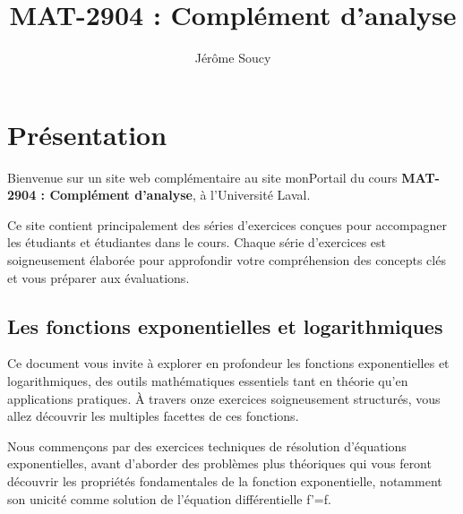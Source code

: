 \documentclass[
  12pt,
  letterpaper,
]{book}
\title{MAT-2904 : Complément d'analyse}
\author{Jérôme Soucy}
\date{}
\renewcommand*\contentsname{Table des matières}
\newcommand\contentsname{Table des matières}
\theoremstyle{remark}
\begin{document}
\frontmatter
\maketitle
\ifdefined\Shaded\renewenvironment{Shaded}{\begin{tcolorbox}[boxrule=0pt, breakable, interior hidden, borderline west={3pt}{0pt}{shadecolor}, frame hidden, sharp corners, enhanced]}{\end{tcolorbox}}\fi

\renewcommand*\contentsname{Table des matières}
{
\hypersetup{linkcolor=}
\setcounter{tocdepth}{2}
\tableofcontents
}
\listoffigures
\listoftables
\mainmatter
{}

\hypertarget{pruxe9sentation}{%
\chapter*{Présentation}\label{pruxe9sentation}}


Bienvenue sur un site web complémentaire au site monPortail du cours
\textbf{MAT-2904 : Complément d'analyse}, à l'Université Laval.

Ce site contient principalement des séries d'exercices conçues pour
accompagner les étudiants et étudiantes dans le cours. Chaque série
d'exercices est soigneusement élaborée pour approfondir votre
compréhension des concepts clés et vous préparer aux évaluations.

\hypertarget{les-fonctions-exponentielles-et-logarithmiques}{%
\section*{Les fonctions exponentielles et
logarithmiques}\label{les-fonctions-exponentielles-et-logarithmiques}}


Ce document vous invite à explorer en profondeur les fonctions
exponentielles et logarithmiques, des outils mathématiques essentiels
tant en théorie qu'en applications pratiques. À travers onze exercices
soigneusement structurés, vous allez découvrir les multiples facettes de
ces fonctions.

Nous commençons par des exercices techniques de résolution d'équations
exponentielles, avant d'aborder des problèmes plus théoriques qui vous
feront découvrir les propriétés fondamentales de la fonction
exponentielle, notamment son unicité comme solution de l'équation
différentielle f'=f.
\end{document}
